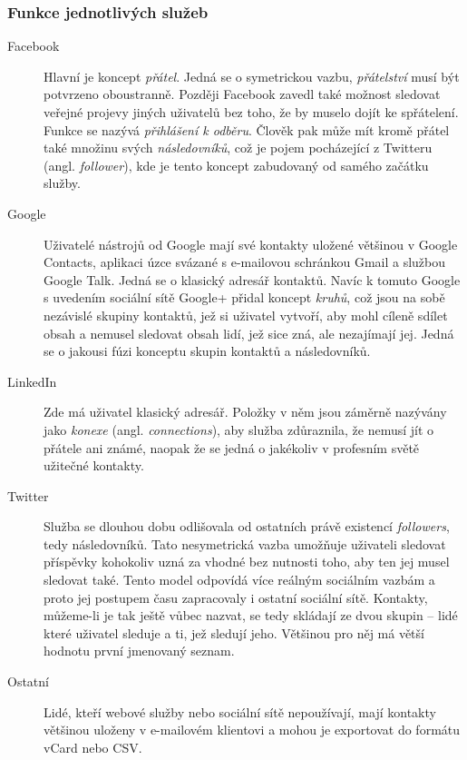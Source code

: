 \documentclass[12pt,oneside,final]{fithesis2}
\begin{document}
\subsubsection*{Funkce jednotlivých služeb}
\begin{description}
    \item[Facebook]
        Hlavní je koncept \emph{přátel}. Jedná se o symetrickou vazbu, \emph{přátelství} musí být potvrzeno oboustranně. Později Facebook zavedl také možnost sledovat veřejné projevy jiných uživatelů bez toho, že by muselo dojít ke spřátelení. Funkce se nazývá \emph{přihlášení k odběru}. Člověk pak může mít kromě přátel také množinu svých \emph{následovníků}, což je pojem pocházející z Twitteru (angl. \emph{follower}), kde je tento koncept zabudovaný od samého začátku služby.

    \item[Google]
        Uživatelé nástrojů od Google mají své kontakty uložené většinou v Google Contacts, aplikaci úzce svázané s e-mailovou schránkou Gmail a službou Google Talk. Jedná se o klasický adresář kontaktů. Navíc k tomuto Google s uvedením sociální sítě Google+ přidal koncept \emph{kruhů}, což jsou na sobě nezávislé skupiny kontaktů, jež si uživatel vytvoří, aby mohl cíleně sdílet obsah a nemusel sledovat obsah lidí, jež sice zná, ale nezajímají jej. Jedná se o jakousi fúzi konceptu skupin kontaktů a následovníků.

    \item[LinkedIn]
        Zde má uživatel klasický adresář. Položky v něm jsou záměrně nazývány jako \emph{konexe} (angl. \emph{connections}), aby služba zdůraznila, že nemusí jít o přátele ani známé, naopak že se jedná o jakékoliv v profesním světě užitečné kontakty.

    \item[Twitter]
        Služba se dlouhou dobu odlišovala od ostatních právě existencí \emph{followers}, tedy následovníků. Tato nesymetrická vazba umožňuje uživateli sledovat příspěvky kohokoliv uzná za vhodné bez nutnosti toho, aby ten jej musel sledovat také. Tento model odpovídá více reálným sociálním vazbám a proto jej postupem času zapracovaly i ostatní sociální sítě. Kontakty, můžeme-li je tak ještě vůbec nazvat, se tedy skládají ze dvou skupin -- lidé které uživatel sleduje a ti, jež sledují jeho. Většinou pro něj má větší hodnotu první jmenovaný seznam.

    \item[Ostatní]
        Lidé, kteří webové služby nebo sociální sítě nepoužívají, mají kontakty většinou uloženy v e-mailovém klientovi a mohou je exportovat do formátu vCard nebo CSV.
\end{description}
\end{document}
